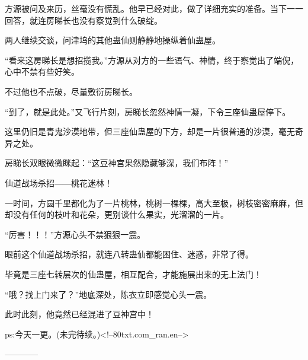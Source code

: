 \begin{this_body}
方源被问及来历，丝毫没有慌乱。他早已经对此，做了详细充实的准备。当下一一回答，就连房睇长也没有察觉到什么破绽。

两人继续交谈，问津坞的其他蛊仙则静静地操纵着仙蛊屋。

“看来这房睇长是想招揽我。”方源从对方的一些语气、神情，终于察觉出了端倪，心中不禁有些好笑。

不过他也不点破，尽量敷衍房睇长。

“到了，就是此处。”又飞行片刻，房睇长忽然神情一凝，下令三座仙蛊屋停下。

这里仍旧是青鬼沙漠地带，但三座仙蛊屋的下方，却是一片很普通的沙漠，毫无奇异之处。

房睇长双眼微微眯起：“这豆神宫果然隐藏够深，我们布阵！”

仙道战场杀招――桃花迷林！

一时间，方圆千里都化为了一片桃林，桃树一棵棵，高大至极，树枝密密麻麻，但却没有任何的枝叶和花朵，更别谈什么果实，光溜溜的一片。

“厉害！！！”方源心头不禁狠狠一震。

眼前这个仙道战场杀招，就连八转蛊仙都能困住、迷惑，非常了得。

毕竟是三座七转层次的仙蛊屋，相互配合，才能施展出来的无上法门！

“哦？找上门来了？”地底深处，陈衣立即感觉心头一震。

此时此刻，他竟然已经混进了豆神宫中！

ps:今天一更。(未完待续。)<!--80txt.com\_ran.en-->

------------

\end{this_body}

